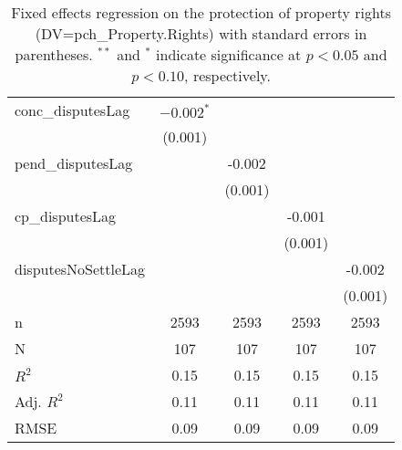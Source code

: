 \begin{table}[ht]
\begin{tabular}{lcccc}
  conc\_disputesLag & $-0.002^{\ast}$ &  &  &  \\ 
   & (0.001) &  &  &  \\ 
  pend\_disputesLag &  & -0.002 &  &  \\ 
   &  & (0.001) &  &  \\ 
  cp\_disputesLag &  &  & -0.001 &  \\ 
   &  &  & (0.001) &  \\ 
  disputesNoSettleLag &  &  &  & -0.002 \\ 
   &  &  &  & (0.001) \\ 
   \hline
n & 2593 & 2593 & 2593 & 2593 \\ 
  N & 107 & 107 & 107 & 107 \\ 
  $R^{2}$ & 0.15 & 0.15 & 0.15 & 0.15 \\ 
  Adj. $R^{2}$ & 0.11 & 0.11 & 0.11 & 0.11 \\ 
  RMSE & 0.09 & 0.09 & 0.09 & 0.09 \\ 
   \hline
\hline
\end{tabular}
\caption{Fixed effects regression on the protection of property rights (DV=pch\_Property.Rights) with standard errors in parentheses. $^{**}$ and $^{*}$ indicate significance at $p< 0.05 $ and $p< 0.10 $, respectively.} 
\end{table}
